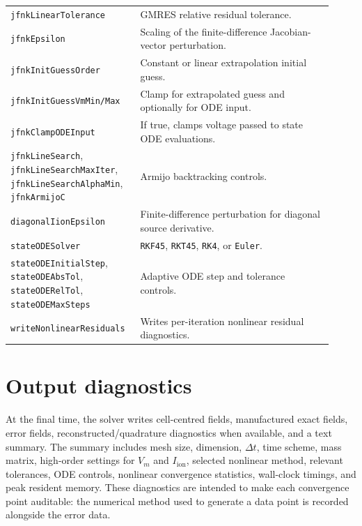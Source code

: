 \documentclass[11pt,a4paper]{article}
\newcommand{\code}[1]{\texttt{\small #1}}
\newcommand{\Vm}{V_m}
\newcommand{\Iion}{I_{\mathrm{ion}}}
\begin{document}
\begin{longtable}{@{}p{0.34\linewidth}p{0.58\linewidth}@{}}
\code{jfnkLinearTolerance} & GMRES relative residual tolerance. \\
\code{jfnkEpsilon} & Scaling of the finite-difference Jacobian-vector perturbation. \\
\code{jfnkInitGuessOrder} & Constant or linear extrapolation initial guess. \\
\code{jfnkInitGuessVmMin/Max} & Clamp for extrapolated guess and optionally for ODE input. \\
\code{jfnkClampODEInput} & If true, clamps voltage passed to state ODE evaluations. \\
\code{jfnkLineSearch}, \code{jfnkLineSearchMaxIter}, \code{jfnkLineSearchAlphaMin}, \code{jfnkArmijoC} & Armijo backtracking controls. \\
\code{diagonalIionEpsilon} & Finite-difference perturbation for diagonal source derivative. \\
\code{stateODESolver} & \code{RKF45}, \code{RKT45}, \code{RK4}, or \code{Euler}. \\
\code{stateODEInitialStep}, \code{stateODEAbsTol}, \code{stateODERelTol}, \code{stateODEMaxSteps} & Adaptive ODE step and tolerance controls. \\
\code{writeNonlinearResiduals} & Writes per-iteration nonlinear residual diagnostics. \\
\bottomrule
\end{longtable}

\section{Output diagnostics}

At the final time, the solver writes cell-centred fields, manufactured exact
fields, error fields, reconstructed/quadrature diagnostics when available, and
a text summary. The summary includes mesh size, dimension, $\Delta t$, time
scheme, mass matrix, high-order settings for $\Vm$ and $\Iion$, selected
nonlinear method, relevant tolerances, ODE controls, nonlinear convergence
statistics, wall-clock timings, and peak resident memory. These diagnostics are
intended to make each convergence point auditable: the numerical method used to
generate a data point is recorded alongside the error data.
\end{document}
